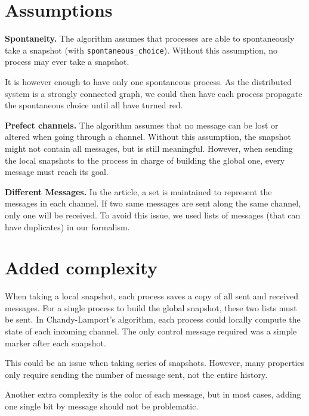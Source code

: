 \documentclass{article}
\begin{document}
\section{Assumptions}

\textbf{Spontaneity.} The algorithm assumes that processes are able to spontaneously take a snapshot (with \lstinline{spontaneous_choice}). Without this assumption, no process may ever take a snapshot.

It is however enough to have only one spontaneous process. As the distributed system is a strongly connected graph, we could then have each process propagate the spontaneous choice until all have turned red.

\textbf{Prefect channels.} The algorithm assumes that no message can be lost or altered when going through a channel.
Without this assumption, the snapshot might not contain all messages, but is still meaningful.
However, when sending the local snapshots to the process in charge of building the global one, every message must reach its goal.

\textbf{Different Messages.} In the article, a set is maintained to represent the messages in each channel.
If two same messages are sent along the same channel, only one will be received. To avoid this issue, we used lists of messages (that can have duplicates) in our formalism.

\section{Added complexity}

When taking a local snapshot, each process saves a copy of all sent and received messages.
For a single process to build the global snapshot, these two lists must be sent.
In Chandy-Lamport's algorithm, each process could locally compute the state of each incoming channel. The only control message required was a simple marker after each snapshot.

This could be an issue when taking series of snapshots. However, many properties only require sending the number of message sent, not the entire history.

Another extra complexity is the color of each message, but in most cases, adding one single bit by message should not be problematic.
\end{document}
